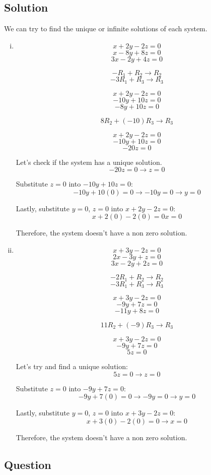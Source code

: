 \documentclass{book}
\begin{document}
\subsection*{Solution}

We can try to find the unique or infinite solutions of each system.

\begin{enumerate}[i.]
	\item \[x + 2y - 2z = 0\]
		\[x - 8y + 8z = 0\]
		\[3x - 2y + 4z = 0\]

		\[-R_1 + R_2 \rightarrow R_2\]
		\[-3R_1 + R_3 \rightarrow R_3\]

		\[x + 2y - 2z = 0\]
		\[-10y + 10z = 0\]
		\[-8y + 10z = 0\]

		\[8R_2 + (-10)R_3 \rightarrow R_3\]

		\[x + 2y - 2z = 0\]
		\[-10y + 10z = 0\]
		\[-20z = 0\]

		Let's check if the system has a unique solution.
		\[-20z = 0 \rightarrow z = 0\]

		Substitute \(z = 0\) into \(-10y + 10z = 0\):
		\[-10y + 10(0) = 0 \rightarrow -10y = 0 \rightarrow y = 0\]

		Lastly, substitute \(y = 0\), \(z = 0\) into \(x + 2y - 2z = 0\):
		\[x + 2(0) - 2(0) = 0 x = 0\]

		Therefore, the system doesn't have a non zero solution.

	\item \[x + 3y - 2z = 0\]
		\[2x - 3y + z = 0\]
		\[3x - 2y + 2z = 0\]

		\[-2R_1 + R_2 \rightarrow R_2\]
		\[-3R_1 + R_3 \rightarrow R_3\]

		\[x + 3y - 2z = 0\]
		\[-9y + 7z = 0\]
		\[-11y + 8z = 0\]

		\[11R_2 + (-9)R_3 \rightarrow R_3\]

		\[x + 3y - 2z = 0\]
		\[-9y + 7z = 0\]
		\[5z = 0\]

		Let's try and find a unique solution:
		\[5z = 0 \rightarrow z = 0\]

		Substitute \(z = 0\) into \(-9y + 7z = 0\):
		\[-9y + 7(0) = 0 \rightarrow -9y = 0 \rightarrow y = 0\]

		Lastly, substitute \(y = 0\), \(z = 0\) into \(x + 3y - 2z = 0\):
		\[x + 3(0) - 2(0) = 0 \rightarrow x = 0\]

		Therefore, the system doesn't have a non zero solution.
\end{enumerate}

\subsection{Question}
\end{document}
